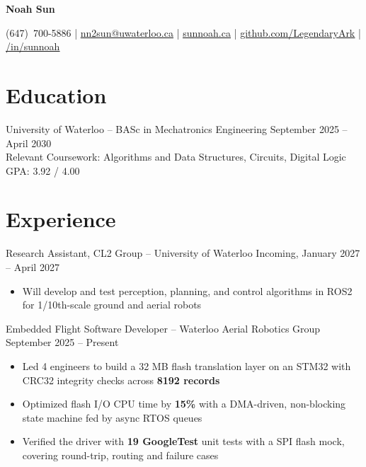 \documentclass[11pt]{article}       %
\newcommand{\textsb}[1]{{\fontseries{sb}\selectfont #1}}
\newcommand{\icon}[1]{\raisebox{0em}{#1}}
\begin{document}
\centerline{\huge \textbf{Noah Sun}}

\vspace{-6pt}

\begin{center}
(647)~700-5886 \;|\;
\href{mailto:nn2sun@uwaterloo.ca}{nn2sun@uwaterloo.ca} \;|\;
\href{https://www.sunnoah.ca}{\underline{sunnoah.ca}} \;|\;
\href{https://github.com/LegendaryArk}{\underline{github.com/LegendaryArk}} \;|\;
\href{https://www.linkedin.com/in/sunnoah/}{\underline{/in/sunnoah}}
\end{center}

\vspace{-9pt}

\section*{Education}
\textsb{University of Waterloo} -- BASc in Mechatronics Engineering \hfill September 2025 -- April 2030 \\[2pt]
\hspace{12pt} Relevant Coursework: Algorithms and Data Structures, Circuits, Digital Logic \hfill GPA: 3.92 / 4.00 \\

\section*{Experience}

\textsb{Research Assistant, CL2 Group} -- University of Waterloo \hfill Incoming, January 2027 -- April 2027 \\
\begin{itemize}
    \item Will develop and test perception, planning, and control algorithms in ROS2 for 1/10th-scale ground and aerial robots
\end{itemize}

\vspace{6pt}

\textsb{Embedded Flight Software Developer} -- Waterloo Aerial Robotics Group \hfill September 2025 -- Present \\
\begin{itemize}
    \item Led 4 engineers to build a 32 MB flash translation layer on an STM32 with CRC32 integrity checks across \textbf{8192 records}
    \item Optimized flash I/O CPU time by \textbf{15\%} with a DMA-driven, non-blocking state machine fed by async RTOS queues
    \item Verified the driver with \textbf{19 GoogleTest} unit tests with a SPI flash mock, covering round-trip, routing and failure cases
\end{itemize}
\end{document}
